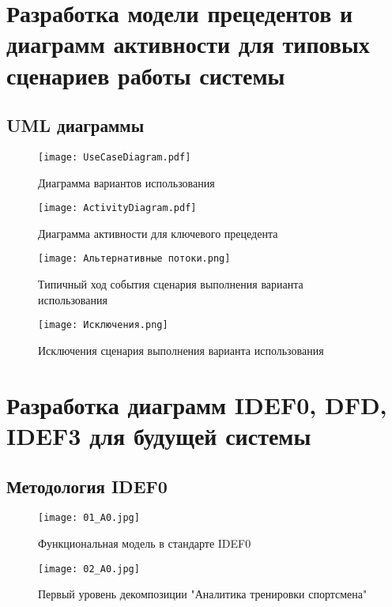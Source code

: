 \documentclass[14pt]{extreport}
\begin{document}
\section{Разработка модели прецедентов и диаграмм активности для типовых сценариев работы системы}

\subsection{UML диаграммы}

\begin{figure}[H]
\centerline{\texttt{[image: UseCaseDiagram.pdf]}}
\caption{Диаграмма вариантов использования}
\label{fig11}
\end{figure}

\begin{figure}[H]
\centerline{\texttt{[image: ActivityDiagram.pdf]}}
\caption{Диаграмма активности для ключевого прецедента}
\label{fig12}
\end{figure}

\begin{figure}[H]
\centerline{\texttt{[image: Альтернативные потоки.png]}}
\caption{Типичный ход события сценария выполнения варианта использования}
\label{fig13}
\end{figure}

\begin{figure}[H]
\centerline{\texttt{[image: Исключения.png]}}
\caption{Исключения сценария выполнения варианта использования}
\label{fig14}
\end{figure}

\section{Разработка диаграмм IDEF0, DFD, IDEF3 для будущей системы}

\subsection{Методология IDEF0}

\begin{figure}[H]
\centerline{\texttt{[image: 01\_A0.jpg]}}
\caption{Функциональная модель в стандарте IDEF0}
\label{fig11}
\end{figure}

\begin{figure}[H]
\centerline{\texttt{[image: 02\_A0.jpg]}}
\caption{Первый уровень декомпозиции "Аналитика тренировки спортсмена"}
\label{fig12}
\end{figure}
\end{document}
